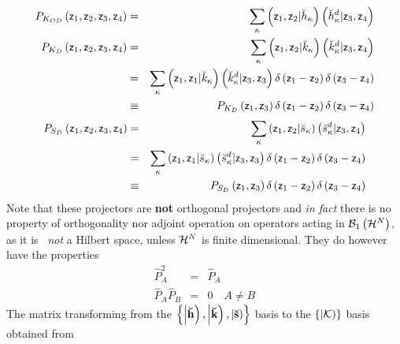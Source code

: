 \begin{eqnarray}
P_{K_{OD}}\left( {\sf z}_{1},{\sf z}_{2},{\sf z}_{3},{\sf z}_{4}\right)
&=&\sum_{\kappa }\left( {\sf z}_{1},{\sf z}_{2}|\breve{h}_{\kappa }\right)
\left( \breve{h}_{\kappa }^{d}|{\sf z}_{3},{\sf z}_{4}\right) \\
P_{K_{D}}\left( {\sf z}_{1},{\sf z}_{2},{\sf z}_{3},{\sf z}_{4}\right)
&=&\sum_{\kappa }\left( {\sf z}_{1},{\sf z}_{2}|\breve{k}_{\kappa }\right)
\left( \breve{k}_{\kappa }^{d}|{\sf z}_{3},{\sf z}_{4}\right)  \nonumber \\
&=&\sum_{\kappa }\left( {\sf z}_{1},{\sf z}_{1}|\breve{k}_{\kappa }\right)
\left( \breve{k}_{\kappa }^{d}|{\sf z}_{3},{\sf z}_{3}\right) \delta \left( 
{\sf z}_{1}-{\sf z}_{2}\right) \delta \left( {\sf z}_{3}-{\sf z}_{4}\right) 
\nonumber \\
&\equiv &P_{K_{D}}\left( {\sf z}_{1},{\sf z}_{3}\right) \delta \left( {\sf z}%
_{1}-{\sf z}_{2}\right) \delta \left( {\sf z}_{3}-{\sf z}_{4}\right)
\end{eqnarray}%
\begin{eqnarray}
P_{S_{D}}\left( {\sf z}_{1},{\sf z}_{2},{\sf z}_{3},{\sf z}_{4}\right)
&=&\sum_{\kappa }\left( {\sf z}_{1},{\sf z}_{2}|\breve{s}_{\kappa }\right)
\left( \breve{s}_{\kappa }^{d}|{\sf z}_{3},{\sf z}_{4}\right)  \nonumber \\
&=&\sum_{\kappa }\left( {\sf z}_{1},{\sf z}_{1}|\breve{s}_{\kappa }\right)
\left( \breve{s}_{\kappa }^{d}|{\sf z}_{3},{\sf z}_{3}\right) \delta \left( 
{\sf z}_{1}-{\sf z}_{2}\right) \delta \left( {\sf z}_{3}-{\sf z}_{4}\right) 
\nonumber \\
&\equiv &P_{S_{D}}\left( {\sf z}_{1},{\sf z}_{3}\right) \delta \left( {\sf z}%
_{1}-{\sf z}_{2}\right) \delta \left( {\sf z}_{3}-{\sf z}_{4}\right)
\end{eqnarray}%
Note that these projectors are {\bf not }orthogonal projectors and {\it in
fact }there is no property of orthogonality nor adjoint operation on
operators acting in ${\cal B}_{1}\left( {\cal H}^{N}\right) $, as it is{\it %
\ not }a Hilbert space, unless ${\cal H}^{N}$ is finite dimensional. They do
however have the properties 
\begin{eqnarray}
\hat{P}_{A}^{2} &=&\hat{P}_{A}  \nonumber \\
\hat{P}_{A}\hat{P}_{B} &=&0\quad A\neq B
\end{eqnarray}%
The matrix transforming from the $\left\{ \left| {\bf \breve{h}}\right)
,\left| {\bf \breve{k}}\right) ,\left| {\bf \breve{s}}\right) \right\} $
basis to the $\left\{ \left| {\cal K}\right) \right\} $ basis obtained from
